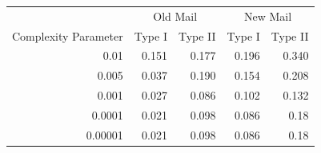 \begin{table}
\begin{tabular}{rrrrr}
       &  \multicolumn{2}{c}{Old Mail} & \multicolumn{2}{c}{New Mail} \\
Complexity Parameter       & Type I & Type II & Type I  & Type II  \\
0.01 & 0.151 & 0.177 & 0.196 & 0.340 \\
0.005 & 0.037 & 0.190  & 0.154  & 0.208 \\
0.001 & 0.027 & 0.086  & 0.102 & 0.132 \\
0.0001 & 0.021 & 0.098 & 0.086  & 0.18 \\
0.00001 & 0.021 & 0.098 & 0.086  & 0.18 \\
\end{tabular}
\end{table}
